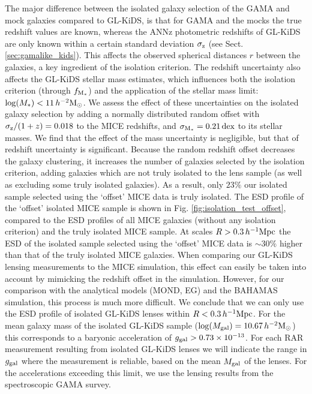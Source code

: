 \documentclass[usenatbib]{mnras}
\newcommand{\hmsun}{\,h^{-2} {\rm M_\odot}}
\newcommand{\hMpc}{\, h^{-1}{\rm{Mpc}} }
\newcommand*{\E}[1]{\times 10^{#1}}
\newcommand{\un}[1]{_{\rm #1}}
\newcommand{\dex}{\, {\rm dex}}
\begin{document}
The major difference between the isolated galaxy selection of the GAMA and mock galaxies compared to GL-KiDS, is that for GAMA and the mocks the true redshift values are known, whereas the ANNz photometric redshifts of GL-KiDS are only known within a certain standard deviation $\sigma\un{z}$ (see Sect. \ref{sec:gamalike_kids}). This affects the observed spherical distances $r$ between the galaxies, a key ingredient of the isolation criterion. The redshift uncertainty also affects the GL-KiDS stellar mass estimates, which influences both the isolation criterion (through $f\un{M_*}$) and the application of the stellar mass limit: $\log(M_*) < 11 \hmsun$. We assess the effect of these uncertainties on the isolated galaxy selection by adding a normally distributed random offset with $\sigma\un{z}/(1+z) = 0.018$ to the MICE redshifts, and $\sigma\un{M_*} = 0.21 \dex$ to its stellar masses. We find that the effect of the mass uncertainty is negligible, but that of redshift uncertainty is significant. Because the random redshift offset decreases the galaxy clustering, it increases the number of galaxies selected by the isolation criterion, adding galaxies which are not truly isolated to the lens sample (as well as excluding some truly isolated galaxies). As a result, only $23\%$ our isolated sample selected using the `offset' MICE data is truly isolated. The ESD profile of the `offset' isolated MICE sample is shown in Fig. \ref{fig:isolation_test_offset}, compared to the ESD profiles of all MICE galaxies (without any isolation criterion) and the truly isolated MICE sample. At scales $R > 0.3 \hMpc$ the ESD of the isolated sample selected using the `offset' MICE data is $\sim 30\%$ higher than that of the truly isolated MICE galaxies. When comparing our GL-KiDS lensing measurements to the MICE simulation, this effect can easily be taken into account by mimicking the redshift offset in the simulation. However, for our comparison with the analytical models (MOND, EG) and the BAHAMAS simulation, this process is much more difficult. We conclude that we can only use the ESD profile of isolated GL-KiDS lenses within $R < 0.3 \hMpc$. For the mean galaxy mass of the isolated GL-KiDS sample ($\log(M\un{gal}) = 10.67 \hmsun$) this corresponds to a baryonic acceleration of $g\un{gal}>0.73\E{-13}$. For each RAR measurement resulting from isolated GL-KiDS lenses we will indicate the range in $g\un{gal}$ where the measurement is reliable, based on the mean $M\un{gal}$ of the lenses. For the accelerations exceeding this limit, we use the lensing results from the spectroscopic GAMA survey.
\end{document}

